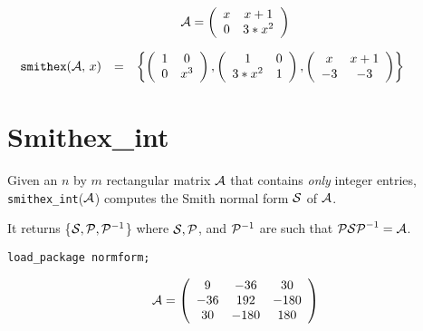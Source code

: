 \begin{displaymath}
{\cal A} = \left( \begin{array}{cc} x & x+1 \\ 0 & 3*x^2 \end{array}
\right)
\end{displaymath}

\begin{displaymath}
\hspace{-0.5in}
\begin{array}{ccc}
{\tt smithex}({\cal A},\, x) & = &
\left\{ \left( \begin{array}{cc} 1 & 0 \\
0 & x^3 \end{array} \right), \left( \begin{array}{cc} 1 & 0 \\ 3*x^2
& 1 \end{array} \right), \left( \begin{array}{cc} x & x+1 \\ -3 & -3
\end{array} \right) \right\} \end{array}
\end{displaymath}


\section{Smithex\_int}

Given an $n$ by $m$ rectangular matrix ${\cal A}$ that contains
{\it only} integer entries, {\tt smithex\_int}(${\cal A}$) computes the
Smith normal form ${\cal S}$ of ${\cal A}$.

It returns \{${\cal S}, {\cal P}, {\cal P}^{-1}$\} where ${\cal S},
{\cal P}$, and ${\cal P}^{-1}$ are such that ${\cal P S P}^{-1} =
{\cal A}$.

{\tt load\_package normform;}

\begin{displaymath}
{\cal A} = \left( \begin{array}{ccc} 9 & -36 & 30 \\ -36 & 192 & -180 \\
30 & -180 & 180  \end{array}
\right)
\end{displaymath}

